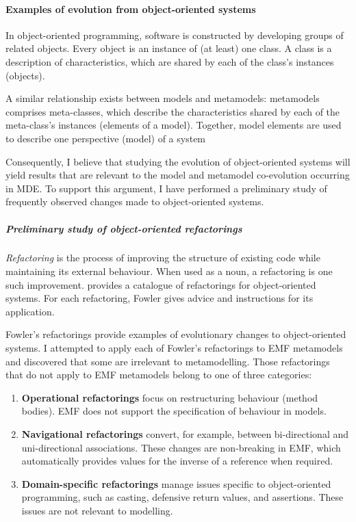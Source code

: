 \paragraph{Examples of evolution from object-oriented systems} %
\label{par:examples_of_evolution_from_object_oriented_systems}
In object-oriented programming, software is constructed by developing groups of related objects. Every object is an instance of (at least) one class. A class is a description of characteristics, which are shared by each of the class's instances (objects).

A similar relationship exists between models and metamodels: metamodels comprises meta-classes, which describe the characteristics shared by each of the meta-class's instances (elements of a model). Together, model elements are used to describe one perspective (model) of a system

Consequently, I believe that studying the evolution of object-oriented systems will yield results that are relevant to the model and metamodel co-evolution occurring in MDE. To support this argument, I have performed a preliminary study of frequently observed changes made to object-oriented systems.

\subparagraph{Preliminary study of object-oriented refactorings} %
\label{subp:preliminary_study_of_object_oriented_refactorings}
\emph{Refactoring} is the process of improving the structure of existing code while maintaining its external behaviour. When used as a noun, a refactoring is one such improvement. \cite{fowler99refactoring} provides a catalogue of refactorings for object-oriented systems. For each refactoring, Fowler gives advice and instructions for its application.

Fowler's refactorings provide examples of evolutionary changes to object-oriented systems. I attempted to apply each of Fowler's refactorings to EMF metamodels and discovered that some are irrelevant to metamodelling. Those refactorings that do not apply to EMF metamodels belong to one of three categories:

\begin{enumerate}
	\item \textbf{Operational refactorings} focus on restructuring behaviour (method bodies). EMF does not support the specification of behaviour in models.
	\item \textbf{Navigational refactorings} convert, for example, between bi-directional and uni-directional associations. These changes are non-breaking in EMF, which automatically provides values for the inverse of a reference when required.
	\item \textbf{Domain-specific refactorings} manage issues specific to object-oriented programming, such as casting, defensive return values, and assertions. These issues are not relevant to modelling.
\end{enumerate}

